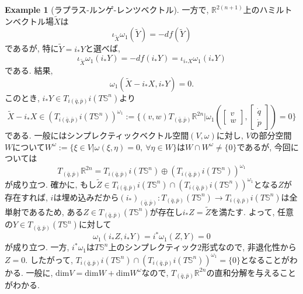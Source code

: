 \documentclass[a4paper]{ujarticle}
\numberwithin{equation}{section}
\theoremstyle{definition}
\newtheorem{example}{Example}
\begin{document}
\begin{example}[ラプラス-ルンゲ-レンツベクトル]
            一方で, $\mathbb{R}^{2(n+1)}$上のハミルトンベクトル場$\tilde{X}$は
            \[
                \iota_{\tilde{X}}\omega_1(\tilde{Y}) = - d f(\tilde{Y})
            \]
            であるが, 特に$\tilde{Y} = i_{*} Y$と選べば,
            \[
                \iota_{\tilde{X}}\omega_1(i_{*}Y) = - d f(i_{*}Y) = \iota_{i_{*}X} \omega_1(i_{*}Y)
            \]
            である. 結果, 
            \[
                \omega_1(\tilde{X} - i_{*}X, i_{*}Y) = 0.
            \]
            このとき, $i_{*}Y \in T_{i(\bar{q}, \bar{p})}i(T \mathbb{S}^n)$より
            \[
                \tilde{X} - i_{*}X \in (T_{i(\bar{q}, \bar{p})}i(T \mathbb{S}^n))^{\omega_1} := \{(v, w) T_{(\bar{q}, \bar{p})} \mathbb{R}^{2n} | \omega_1(
                    \begin{bmatrix}
                        v \\
                        w
                    \end{bmatrix},
                    \begin{bmatrix}
                        \dot{q} \\
                        \dot{p}
                    \end{bmatrix}
                    ) = 0 \}
            \]
            である. 一般にはシンプレクティックベクトル空間$(V, \omega)$に対し, 
            $V$の部分空間$W$について$W^{\omega} := \{\xi \in V | \omega(\xi, \eta) = 0, \ \forall \eta \in W\}$は$W \cap W^{\omega} \neq \{0\}$であるが, 
            今回については
            \[
                T_{(\bar{q}, \bar{p})} \mathbb{R}^{2n} = T_{i(\bar{q}, \bar{p})}i(T \mathbb{S}^n) \oplus (T_{i(\bar{q}, \bar{p})}i(T \mathbb{S}^n))^{\omega_1}
            \]
            が成り立つ.
            確かに, もし$\tilde{Z} \in  T_{i(\bar{q}, \bar{p})}i(T \mathbb{S}^n) \cap (T_{i(\bar{q}, \bar{p})}i(T \mathbb{S}^n))^{\omega_1}$となる$Z$が存在すれば,
            $i$は埋め込みだから$(i_{*})_{(\bar{q}, \bar{p})} : T_{(\bar{q}, \bar{p})}(T \mathbb{S}^n) \rightarrow T_{i(\bar{q}, \bar{p})}i(T \mathbb{S}^n)$は全単射であるため,
            ある$Z \in T_{(\bar{q}, \bar{p})}(T \mathbb{S}^n)$が存在し$i_{*} Z = \tilde{Z}$を満たす. よって, 任意の$Y \in T_{(\bar{q}, \bar{p})}(T \mathbb{S}^n)$に対して
            \[
                    \omega_1(i_{*}Z, i_{*}Y) = i^{*}\omega_1(Z, Y) = 0
            \]
            が成り立つ. 一方, $i^{*} \omega_1$は$T \mathbb{S}^n$上のシンプレクティック$2$形式なので, 非退化性から$Z = 0$.
            したがって, $T_{i(\bar{q}, \bar{p})}i(T \mathbb{S}^n) \cap (T_{i(\bar{q}, \bar{p})}i(T \mathbb{S}^n))^{\omega_1} = \{0\}$となることがわかる.
            一般に, $\mathrm{dim} V = \mathrm{dim} W + \mathrm{dim} W^{\omega}$なので, $T_{(\bar{q}, \bar{p})} \mathbb{R}^{2n}$の直和分解を与えることがわかる.


\end{example}
\end{document}
